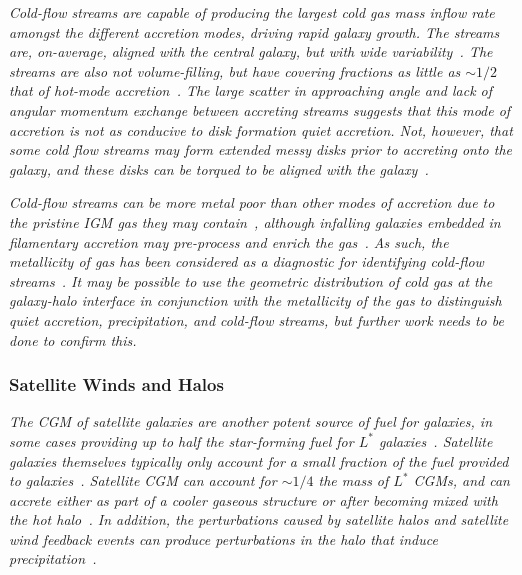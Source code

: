 \documentclass[fleqn,usenatbib]{mnras}
\begin{document}
\textit{
Cold-flow streams are capable of producing the largest cold gas mass inflow rate amongst the different accretion modes, driving rapid galaxy growth.
The streams are, on-average, aligned with the central galaxy, but with wide variability~\citep[e.g.][]{Stewart2011a, danovich2012, Stewart2013, Stewart2017}.
The streams are also not volume-filling, but have covering fractions as little as $\sim 1/2$ that of hot-mode accretion~\citep[e.g.][]{Wright2021}.
The large scatter in approaching angle and lack of angular momentum exchange between accreting streams suggests that this mode of accretion is not as conducive to disk formation quiet accretion.
Not, however, that some cold flow streams may form extended messy disks prior to accreting onto the galaxy, and these disks can be torqued to be aligned with the galaxy~\cite{danovich2012, Danovich2015}.
}

\textit{
Cold-flow streams can be more metal poor than other modes of accretion due to the pristine IGM gas they may contain~\citep[e.g.][]{Hafen2019, Wright2021}, although infalling galaxies embedded in filamentary accretion may pre-process and enrich the gas~\citep[e.g.][]{Hafen2019}.
As such, the metallicity of gas has been considered as a diagnostic for identifying cold-flow streams~\citep[e.g.][]{Hafen2016}.
It may be possible to use the geometric distribution of cold gas at the galaxy-halo interface in conjunction with the metallicity of the gas to distinguish quiet accretion, precipitation, and cold-flow streams, but further work needs to be done to confirm this.
}

\subsubsection{Satellite Winds and Halos}

\textit{
The CGM of satellite galaxies are another potent source of fuel for galaxies, in some cases providing up to half the star-forming fuel for $L^*$ galaxies~\citep[intergalactic transfer; ][]{Angles-Alcazar2017}.
Satellite galaxies themselves typically only account for a small fraction of the fuel provided to galaxies~\citep{Angles-Alcazar2017}. 
Satellite CGM can account for $\sim1/4$ the mass of $L^*$ CGMs, and can accrete either as part of a cooler gaseous structure or after becoming mixed with the hot halo~\citep{Hafen2019, Hafen2020}.
In addition, the perturbations caused by satellite halos and satellite wind feedback events can produce perturbations in the halo that induce precipitation~\citep{Esmerian2020}.
}
\end{document}
